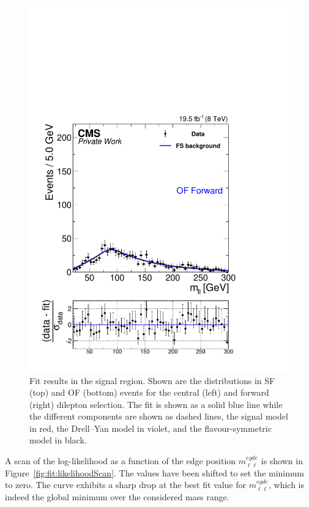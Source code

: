 \begin{figure}[!hbp]
\begin{minipage}[t]{0.49\textwidth}
    \includegraphics[width=\textwidth]{plots/results/fit/fit2012OFOS_ETHTriangle_SignalInclusive_Combined_Full2012_ETHTriangle_Forward.pdf}
  \end{minipage}
  \caption{Fit results in the signal region. Shown are the \mll distributions in SF (top) and OF (bottom) events for the central (left) and forward (right) dilepton selection. The fit is shown as a solid blue line while the different components are shown as dashed lines, the signal model in red, the Drell--Yan model in violet, and the flavour-symmetric model in black.}
  \label{fig:fit:result}
\end{figure}



A scan of the log-likelihood as a function of the edge position $m_{\ell\ell}^{egde}$ is shown in Figure~\ref{fig:fit:likelihoodScan}. The values have been shifted to set the minimum to zero. The curve exhibits a sharp drop at the best fit value for $m_{\ell\ell}^{egde}$, which is indeed the global minimum over the considered mass range. 

